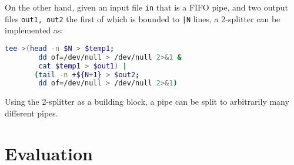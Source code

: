 \documentclass[acmsmall,10pt,review,anonymous]{acmart}
\newcommand{\ttt}[1]{\texttt{\small #1}}
\newcommand{\kk}[1]{[{\color{magenta}#1 --- kk}]}
\begin{document}
\noindent
On the other hand, given an input file \ttt{in} that is a FIFO pipe,
and two output files \ttt{out1, out2} the first of which is bounded
to \ttt{|N} lines, a 2-splitter can be implemented as:

\begin{lstlisting}[language=sh, float=h, numbers=none]
  tee >(head -n $N > $temp1;
        dd of=/dev/null > /dev/null 2>&1 &
        cat $temp1 > $out1) |
       (tail -n +${N+1} > $out2;
        dd of=/dev/null > /dev/null 2>&1)
\end{lstlisting}

\noindent
Using the 2-splitter as a building block, a pipe can be split to
arbitrarily many different pipes.


\section{Evaluation}
\label{eval}

% 
% 
% 
% 
% 
\end{document}
